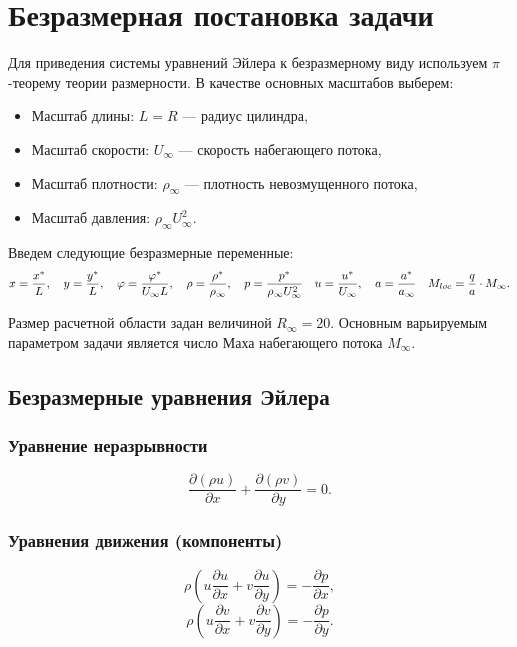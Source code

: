 \section{Безразмерная постановка задачи}
	
	Для приведения системы уравнений Эйлера к безразмерному виду используем $\pi$-теорему теории размерности. В качестве основных масштабов выберем:
	\begin{itemize}
		\item Масштаб длины: $L = R$ — радиус цилиндра,
		\item Масштаб скорости: $U_\infty$ — скорость набегающего потока,
		\item Масштаб плотности: $\rho_\infty$ — плотность невозмущенного потока,
		\item Масштаб давления: $\rho_\infty U_\infty^2$.
	\end{itemize}
	
	Введем следующие безразмерные переменные:
	\[
	x = \frac{x^*}{L}, \quad y = \frac{y^*}{L}, \quad \varphi = \frac{\varphi^*}{U_\infty L}, \quad \rho = \frac{\rho^*}{\rho_\infty}, \quad p = \frac{p^*}{\rho_\infty U_\infty^2} \\
	\quad u = \frac{u^*}{U_\infty}, \quad a = \frac{a^*}{a_\infty}\quad M_{loc} = \frac{q}{a}\cdot M_\infty.
	\]
	
	Размер расчетной области задан величиной $R_\infty = 20$. Основным варьируемым параметром задачи является число Маха набегающего потока $M_\infty$.
	
	\subsection{Безразмерные уравнения Эйлера}
	
	\subsubsection{Уравнение неразрывности}
	\[
	\frac{\partial (\rho u)}{\partial x} + \frac{\partial (\rho v)}{\partial y} = 0.
	\]
	
	\subsubsection{Уравнения движения (компоненты)}
	\[
	\rho \left( u \frac{\partial u}{\partial x} + v \frac{\partial u}{\partial y} \right) = -\frac{\partial p}{\partial x},
	\]
	\[
	\rho \left( u \frac{\partial v}{\partial x} + v \frac{\partial v}{\partial y} \right) = -\frac{\partial p}{\partial y}.
	\]
	
